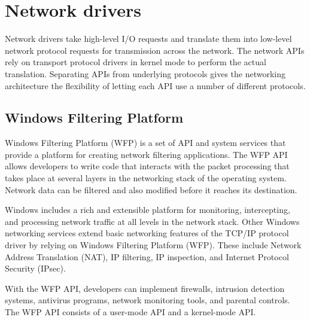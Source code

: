 \vspace{5mm}
\section{Network drivers}
\vspace{5mm}

Network drivers take high-level I/O requests and translate them into low-level network protocol
requests for transmission across the network. The network APIs rely on transport protocol drivers in
kernel mode to perform the actual translation. Separating APIs from underlying protocols gives the
networking architecture the flexibility of letting each API use a number of different protocols.

\vspace{5mm}
\subsection{Windows Filtering Platform}
\vspace{5mm}

Windows Filtering Platform (WFP) is a set of API and system services that provide a platform for creating network filtering applications. The WFP API allows developers to write code that interacts with the packet processing that takes place at several layers in the networking stack of the operating system. Network data can be filtered and also modified before it reaches its destination.

\vspace{5mm}

\cite{BOOK:1} Windows includes a rich and extensible platform for monitoring, intercepting, and processing
network traffic at all levels in the network stack. Other Windows networking services extend basic
networking features of the TCP/IP protocol driver by relying on Windows Filtering Platform (WFP).
These include Network Address Translation (NAT), IP filtering, IP inspection, and Internet Protocol
Security (IPsec).

\vspace{5mm}

With the WFP API, developers can implement firewalls, intrusion detection systems, antivirus programs, network monitoring tools, and parental controls. The WFP API consists of a user-mode API and a kernel-mode API.

\vspace{5mm}

